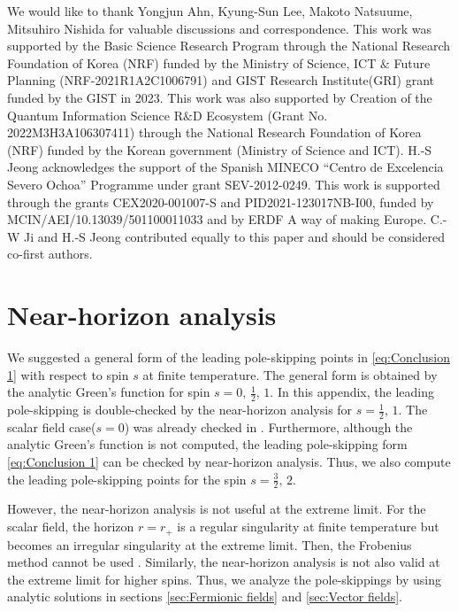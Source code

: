 \documentclass[11pt,a4paper]{article}
\newcommand\CW[1]{\textcolor{red}{\bf [CW:\,#1]}}
\begin{document}
\acknowledgments

We would like to thank {Yongjun Ahn, Kyung-Sun Lee, Makoto Natsuume, Mitsuhiro Nishida} for valuable discussions and correspondence.
%
This work was supported by the Basic Science Research Program through the National Research Foundation of Korea (NRF) funded by the Ministry of Science, ICT $\&$ Future Planning (NRF-2021R1A2C1006791) and GIST Research Institute(GRI) grant funded by the GIST in 2023. This work was also supported by Creation
of the Quantum Information Science R$\&$D Ecosystem (Grant No. 2022M3H3A106307411)
through the National Research Foundation of Korea (NRF) funded by the Korean government (Ministry of Science and ICT).
%
H.-S Jeong acknowledges the support of the Spanish MINECO ``Centro de Excelencia Severo Ochoa'' Programme under grant SEV-2012-0249. This work is supported through the grants CEX2020-001007-S and PID2021-123017NB-I00, funded by MCIN/AEI/10.13039/501100011033 and by ERDF A way of making Europe.
%
C.-W Ji and H.-S Jeong contributed equally to this paper and should be considered co-first authors.






\appendix
%    
\section{Near-horizon analysis} \label{sec:Near-horizon analysis}
We suggested a general form of the leading pole-skipping points in \eqref{eq:Conclusion 1} with respect to spin $s$ at finite temperature. The general form is obtained by the analytic Green's function for spin $s=0,\, \frac{1}{2},\, 1$. In this appendix, the leading pole-skipping is double-checked by the near-horizon analysis for $s=\frac{1}{2},\, 1$. The scalar field case($s=0$) was already checked in \cite{Natsuume:2020snz}. Furthermore, although the analytic Green's function is not computed, the leading pole-skipping form \eqref{eq:Conclusion 1} can be checked by near-horizon analysis. Thus, we also compute the leading pole-skipping points for the spin $s=\frac{3}{2},\, 2$.

However, the near-horizon analysis is not useful at the extreme limit. For the scalar field, the horizon $r=r_+$ is a regular singularity at finite temperature but becomes an irregular singularity at the extreme limit. Then, the Frobenius method cannot be used \cite{Natsuume:2020snz}. Similarly, the near-horizon analysis is not also valid at the extreme limit for higher spins. Thus, we analyze the pole-skippings by using analytic solutions in sections \ref{sec:Fermionic fields} and \ref{sec:Vector fields}.
\end{document}
